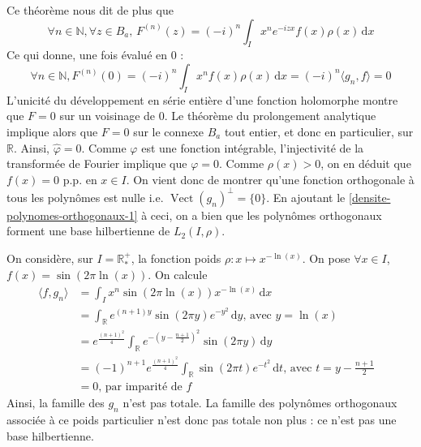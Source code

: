 \begin{demonstration}
		Ce théorème nous dit de plus que
		\[ \forall n \in \mathbb{N}, \forall z \in B_a, \, F^{(n)}(z) = (-i)^n \int_I x^n e^{-izx} f(x) \rho(x) \, \mathrm{d}x \]
		Ce qui donne, une fois évalué en $0$ :
		\[ \forall n \in \mathbb{N}, F^{(n)}(0) = (-i)^n \int_I x^n f(x) \rho(x) \, \mathrm{d}x = (-i)^n \langle g_n, f \rangle = 0 \]
		L'unicité du développement en série entière d'une fonction holomorphe montre que $F = 0$ sur un voisinage de $0$. Le théorème du prolongement analytique implique alors que $F = 0$ sur le connexe $B_a$ tout entier, et donc en particulier, sur $\mathbb{R}$. Ainsi, $\hat{\varphi} = 0$. Comme $\varphi$ est une fonction intégrable, l'injectivité de la transformée de Fourier implique que $\varphi = 0$. Comme $\rho(x) > 0$, on en déduit que $f(x) = 0$ p.p. en $x \in I$. On vient donc de montrer qu'une fonction orthogonale à tous les polynômes est nulle i.e. $\operatorname{Vect}(g_n)^\perp = \{ 0 \}$.
		En ajoutant le \cref{densite-polynomes-orthogonaux-1} à ceci, on a bien que les polynômes orthogonaux forment une base hilbertienne de $L_2(I, \rho)$.
	\end{demonstration}
	
	\begin{cexample}
		On considère, sur $I = \mathbb{R}^+_*$, la fonction poids $\rho : x \mapsto x^{-\ln(x)}$. On pose $\forall x \in I$, $f(x) = \sin(2 \pi \ln(x))$. On calcule
		\begin{align*}
			\langle f, g_n \rangle & = \int_I x^n \sin(2\pi \ln(x)) x^{-\ln(x)} \, \mathrm{d}x                                                     &   \\
			&= \int_\mathbb{R} e^{(n+1)y} \sin(2 \pi y) e^{-y^2} \, \mathrm{d}y \text{, avec } y = \ln(x) \\
			& = e^{\frac{(n+1)^2}{4}} \int_\mathbb{R} e^{- \left (y - \frac{n+1}{2} \right)^2} \sin(2 \pi y) \, \mathrm{d}y &   \\
			&= (-1)^{n+1} e^{\frac{(n+1)^2}{4}} \int_\mathbb{R} \sin(2 \pi t) e^{-t^2} \, \mathrm{d}t \text{, avec } t = y - \frac{n+1}{2} \\
			&= 0 \text{, par imparité de } f
		\end{align*}
		Ainsi, la famille des $g_n$ n'est pas totale. La famille des polynômes orthogonaux associée à ce poids particulier n'est donc pas totale non plus : ce n'est pas une base hilbertienne.
	\end{cexample}
